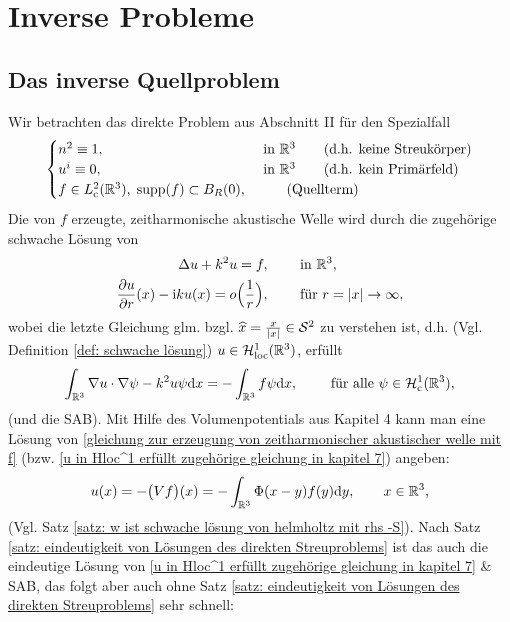 \renewcommand\thesection{\Roman{section}}
\setcounter{section}{2}
\section{Inverse Probleme}
\renewcommand\thesection{\arabic{section}}
\renewcommand\thesubsection{\arabic{subsection}}
\setcounter{subsection}{6}
\setcounter{section}{7}

\subsection{Das inverse Quellproblem}

Wir betrachten das direkte Problem aus Abschnitt II für den Spezialfall
\begin{equation*}
	\begin{cases}
		n^2\equiv1,&\text{ in }\mathbb{R}^3\qquad\text{(d.h. keine Streukörper)}\\
		u^i\equiv0,&\text{ in }\mathbb{R}^3\qquad\text{(d.h. kein Primärfeld)}\\
		f\in L_{\mathrm{c}}^2(\mathbb{R}^3),\;\operatorname{supp}(f)\subset B_R(0),&\qquad\text{(Quellterm)}
	\end{cases}
\end{equation*}
Die von \(f\) erzeugte, zeitharmonische akustische Welle wird durch die zugehörige schwache Lösung von
\begin{equation}
	\label{gleichung zur erzeugung von zeitharmonischer akustischer welle mit f}
	\begin{aligned}
		\Delta u+k^2u=f,&\qquad\text{ in }\mathbb{R}^3,\\
		\frac{\partial u}{\partial r}(x)-\mathrm{i} ku(x)=o\Big(\frac{1}{r}\Big),&\qquad\text{ für }r=|x|\to\infty,
	\end{aligned}
\end{equation}
wobei die letzte Gleichung glm. bzgl. \(\widehat{x}=\frac{x}{|x|}\in\mathcal{S}^2\) zu verstehen ist, d.h. (Vgl. Definition \ref{def: schwache lösung}) \(u\in\mathcal{H}_{\mathrm{loc}}^1(\mathbb{R}^3)\), erfüllt
\begin{equation}
	\label{u in Hloc^1 erfüllt zugehörige gleichung in kapitel 7}
	\int_{\mathbb{R}^3}\nabla u\cdot\nabla\psi-k^2 u\psi\mathrm{d}x=-\int_{\mathbb{R}^3}f\psi\mathrm{d}x,\qquad\text{  für alle }\psi\in\mathcal{H}_{\mathrm{c}}^1(\mathbb{R}^3),
\end{equation}
(und die SAB). Mit Hilfe des Volumenpotentials aus Kapitel 4 kann man eine Lösung von \eqref{gleichung zur erzeugung von zeitharmonischer akustischer welle mit f} (bzw. \eqref{u in Hloc^1 erfüllt zugehörige gleichung in kapitel 7}) angeben:
\begin{equation*}
	u(x)=-\big(Vf\big)(x)=-\int_{\mathbb{R}^3}\Phi(x-y)f(y)\mathrm{d}y,\qquad x\in\mathbb{R}^3,
\end{equation*}
(Vgl. Satz \ref{satz: w ist schwache lösung von helmholtz mit rhs -S}). Nach Satz \ref{satz: eindeutigkeit von Lösungen des direkten Streuproblems} ist das auch die eindeutige Lösung von \eqref{u in Hloc^1 erfüllt zugehörige gleichung in kapitel 7} \& SAB, das folgt aber auch ohne Satz \ref{satz: eindeutigkeit von Lösungen des direkten Streuproblems} sehr schnell:

